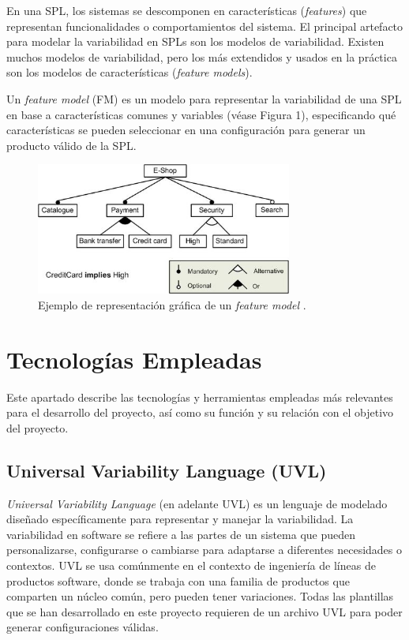 \documentclass[12pt, a4paper, twoside]{article}
\begin{document}
En una SPL, los sistemas se descomponen en características (\emph{features}) que representan funcionalidades o comportamientos del sistema. 
El principal artefacto para modelar la variabilidad en SPLs son los modelos de variabilidad. Existen muchos modelos 
de variabilidad, pero los más extendidos y usados en la práctica son los modelos de características (\emph{feature models}). 

Un \emph{feature model} (FM) \cite{Kang1990_FODA,wikipedia_feature_model} es un modelo para representar la variabilidad de una SPL en base a características comunes y variables (véase Figura 1), especificando qué características se pueden seleccionar en una configuración para generar 
un producto válido de la SPL.  

\begin{figure}[ht]
	\centering
		\includegraphics[width=0.75\textwidth]{fm.example.jpg}
	\caption{Ejemplo de representación gráfica de un \emph{feature model} \cite{wikipedia_feature_model}.}
\end{figure}












\section{Tecnologías Empleadas}
\label{sec:Tecnologias Empleadas}
Este apartado describe las tecnologías y herramientas empleadas más relevantes para el desarrollo del proyecto, así como su función y su relación con el objetivo del proyecto.

\subsection{Universal Variability Language (UVL)}

\emph{Universal Variability Language} (en adelante UVL) \cite{uvl} es un lenguaje de modelado diseñado específicamente para representar y manejar la variabilidad. 
La variabilidad en software se refiere a las partes de un sistema que pueden personalizarse, configurarse o cambiarse para adaptarse a diferentes necesidades o contextos. 
UVL se usa comúnmente en el contexto de ingeniería de líneas de productos software, donde se trabaja con una familia de productos que comparten un núcleo común, pero pueden tener variaciones.
Todas las plantillas que se han desarrollado en este proyecto requieren de un archivo UVL para poder generar configuraciones válidas.
\end{document}
